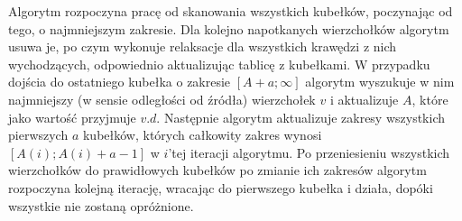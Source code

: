 Algorytm rozpoczyna pracę od skanowania wszystkich kubełków, poczynając od tego, o najmniejszym zakresie. Dla kolejno napotkanych wierzchołków algorytm usuwa je, po czym wykonuje relaksacje dla wszystkich krawędzi z nich wychodzących, odpowiednio aktualizując tablicę z kubełkami. W przypadku dojścia do ostatniego kubełka o zakresie $ \left [ A + a ; \infty \right] $ algorytm wyszukuje w nim najmniejszy (w sensie odległości od źródła) wierzchołek $v$ i aktualizuje $A$, które jako wartość przyjmuje $v.d$. Następnie algorytm aktualizuje zakresy wszystkich pierwszych $a$ kubełków, których całkowity zakres wynosi $ \left [ A \left( i \right) ; A \left( i \right) + a - 1 \right] $ w $i$'tej iteracji algorytmu. Po przeniesieniu wszystkich wierzchołków do prawidłowych kubełków po zmianie ich zakresów algorytm rozpoczyna kolejną iterację, wracając do pierwszego kubełka i działa, dopóki wszystkie nie zostaną opróżnione.

